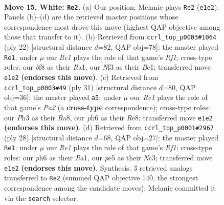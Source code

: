 \documentclass[11pt]{article}
\begin{document}
\clearpage

\begin{figure}[p]\centering
\begin{subfigure}{0.46\textwidth}\centering
\resizebox{\linewidth}{!}{%
\newchessgame
\chessboard[
  setfen={r2q1bk1/1bp1rpp1/p1np3p/1p1Bp3/4P3/P2P1N1P/1PPB1PP1/R2QR1K1 w - - 1 15},
  showmover=false,
  pgfstyle=straightmove, color=movearrow, markmove={e1-e2}
]}
\caption{}
\end{subfigure}\hfill
\begin{subfigure}{0.46\textwidth}\centering
\resizebox{\linewidth}{!}{%
\newchessgame
\chessboard[
  setfen={r1q2rk1/1bp1bppp/p1np4/1p1Bp3/4P3/3P1N1P/PPP2PP1/R1BQ1RK1 w - - 1 12},
  showmover=false,
  pgfstyle=straightmove, color=movearrow, markmove={f1-e1}
]}
\caption{}
\end{subfigure}
\\[4pt]
\begin{subfigure}{0.46\textwidth}\centering
\resizebox{\linewidth}{!}{%
\newchessgame
\chessboard[
  setfen={r3rbk1/ppnq1pp1/2p2p2/7p/2PP2bP/P3BNP1/1P1Q1PB1/2R2RK1 b - - 0 16},
  showmover=false,
  pgfstyle=straightmove, color=movearrow, markmove={a7-a5}
]}
\caption{}
\end{subfigure}\hfill
\begin{subfigure}{0.46\textwidth}\centering
\resizebox{\linewidth}{!}{%
\newchessgame
\chessboard[
  setfen={r4rk1/1p1bqpbp/p1nnp1p1/3p4/3P1B2/P1NBPN1P/1P3PP1/R2Q1RK1 w - - 2 15},
  showmover=false,
  pgfstyle=straightmove, color=movearrow, markmove={f1-e1}
]}
\caption{}
\end{subfigure}
\caption{\textbf{Move 15, White: \texttt{Re2}.} (a) Our position; Melanie plays \texttt{Re2} (\texttt{e1e2}). Panels (b)--(d) are the retrieved master positions whose correspondence most drove this move (highest QAP objective among those that transfer to it). (b) Retrieved from \texttt{ccrl\_top\_p0003\#1064} (ply 22) [structural distance $d$=82, QAP obj=78]: the master played \texttt{Re1}; under $\mu$ our \emph{Re1} plays the role of that game's \emph{Rf1}; cross-type roles: our \emph{b}f8 as their \emph{R}a1, our \emph{N}f3 as their \emph{B}c1; transferred move \texttt{e1e2} \textbf{(endorses this move)}. (c) Retrieved from \texttt{ccrl\_top\_p0003\#49} (ply 31) [structural distance $d$=80, QAP obj=36]: the master played \texttt{a5}; under $\mu$ our \emph{Re1} plays the role of that game's \emph{Pa2} (a \textbf{cross-type} correspondence); cross-type roles: our \emph{P}h3 as their \emph{R}a8, our \emph{p}h6 as their \emph{R}e8; transferred move \texttt{e1e2} \textbf{(endorses this move)}. (d) Retrieved from \texttt{ccrl\_top\_p0001\#2967} (ply 28) [structural distance $d$=68, QAP obj=27]: the master played \texttt{Re1}; under $\mu$ our \emph{Re1} plays the role of that game's \emph{Rf1}; cross-type roles: our \emph{p}h6 as their \emph{R}a1, our \emph{p}e5 as their \emph{N}c3; transferred move \texttt{e1e2} \textbf{(endorses this move)}. Synthesis: 3 retrieved analogs transferred to \texttt{Re2} (summed QAP objective 140, the strongest correspondence among the candidate moves); Melanie committed it via the \texttt{search} selector.}
\label{fig:thought-m28}
\end{figure}
\end{document}
